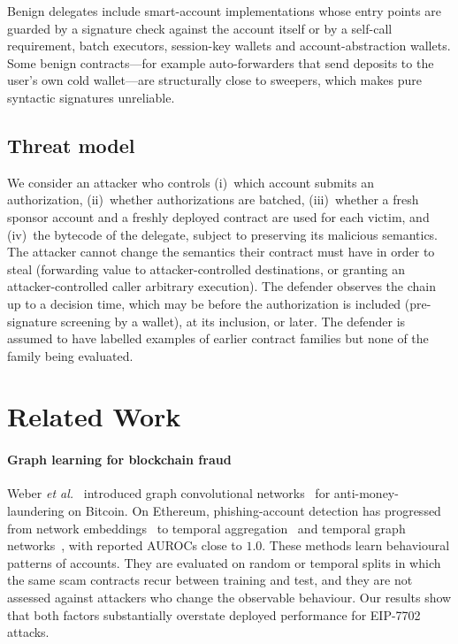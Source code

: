 \documentclass[journal]{IEEEtran}
\begin{document}
Benign delegates include smart-account implementations whose entry points are guarded by a signature check against the account itself or by a self-call requirement, batch executors, session-key wallets and account-abstraction wallets. Some benign contracts---for example auto-forwarders that send deposits to the user's own cold wallet---are structurally close to sweepers, which makes pure syntactic signatures unreliable.

\subsection{Threat model}
We consider an attacker who controls (i)~which account submits an authorization, (ii)~whether authorizations are batched, (iii)~whether a fresh sponsor account and a freshly deployed contract are used for each victim, and (iv)~the bytecode of the delegate, subject to preserving its malicious semantics. The attacker cannot change the semantics their contract must have in order to steal (forwarding value to attacker-controlled destinations, or granting an attacker-controlled caller arbitrary execution). The defender observes the chain up to a decision time, which may be before the authorization is included (pre-signature screening by a wallet), at its inclusion, or later. The defender is assumed to have labelled examples of earlier contract families but none of the family being evaluated.

\section{Related Work}
\label{sec:related}

\paragraph{Graph learning for blockchain fraud} Weber \emph{et al.}~\cite{weber2019aml} introduced graph convolutional networks~\cite{kipf2017gcn} for anti-money-laundering on Bitcoin. On Ethereum, phishing-account detection has progressed from network embeddings~\cite{wu2022phishers} to temporal aggregation~\cite{li2022ttagn} and temporal graph networks~\cite{xu2020tgat,rossi2020tgn}, with reported AUROCs close to $1.0$. These methods learn behavioural patterns of accounts. They are evaluated on random or temporal splits in which the same scam contracts recur between training and test, and they are not assessed against attackers who change the observable behaviour. Our results show that both factors substantially overstate deployed performance for EIP-7702 attacks.
\end{document}
